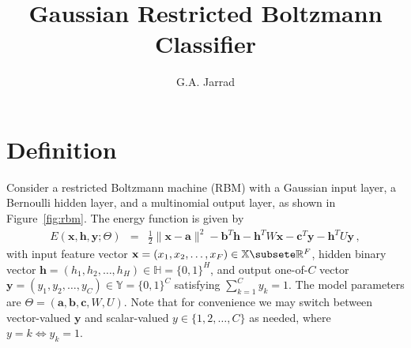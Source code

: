 \documentclass[a4paper]{article}
\title{Gaussian Restricted Boltzmann Classifier}
\author{G.A. Jarrad}
\newcommand{\v}[1]{\mathbf{#1}}
\begin{document}
\maketitle
{}
\section{Definition}\label{sec:intro}
Consider a restricted Boltzmann machine (RBM) with a Gaussian input layer,
a Bernoulli hidden layer, and a multinomial output layer, as shown in 
Figure~\ref{fig:rbm}.
The energy function is given by
\begin{eqnarray}
    E(\v{x},\v{h},\v{y}; \Theta) & = & \frac{1}{2}\|\v{x}-\v{a}\|^2
    - \v{b}^T\v{h} - \v{h}^T W\v{x} - \v{c}^T\v{y} - \v{h}^T U\v{y}\,,
\end{eqnarray}
with input feature vector $\v{x}=(x_1,x_2,\ldots,x_F)\in\mathbb{X}\subsete\mathbb{R}^F$, 
hidden binary vector $\v{h}=(h_1,h_2,\ldots,h_H)\in\mathbb{H}=\{0,1\}^H$, and output 
one-of-$C$ vector 
$\v{y}=(y_1,y_2,\ldots,y_C)\in\mathbb{Y}=\{0,1\}^C$
satisfying $\sum_{k=1}^C y_k=1$.
The model parameters are $\Theta=(\v{a}, \v{b}, \v{c}, W, U)$.
Note that for convenience we may switch between vector-valued $\v{y}$
and scalar-valued $y\in\{1,2,\ldots,C\}$ as needed, where $y=k \Leftrightarrow y_k=1$.
\end{document}
